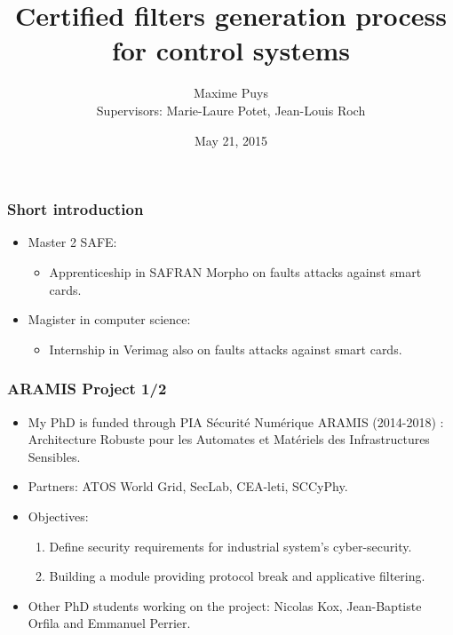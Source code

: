 \documentclass{beamer}
\title[Certified filters for control systems]{Certified filters generation process for control systems}
\author[Maxime Puys]{Maxime Puys\\Supervisors: Marie-Laure Potet, Jean-Louis Roch}
\institute{Verimag, UGA - MOAIS, INRIA}
\date{May 21, 2015}
\begin{document}
\begin{frame}
    \maketitle
\end{frame}

\begin{frame}
    \frametitle{Short introduction}

    \begin{itemize}
        \item Master 2 SAFE:
        \begin{itemize}
            \item Apprenticeship in SAFRAN Morpho on faults attacks against smart cards.
        \end{itemize}
            \vfill
        \item Magister in computer science:
        \begin{itemize}
            \item Internship in Verimag also on faults attacks against smart cards.
        \end{itemize}
    \end{itemize}
\end{frame}

\begin{frame}
    \frametitle{ARAMIS Project 1/2}

    \begin{itemize}
        \item My PhD is funded through PIA S\'ecurit\'e Num\'erique ARAMIS (2014-2018) : Architecture Robuste pour les Automates et Mat\'eriels des Infrastructures Sensibles.
            \vfill
        \item Partners: ATOS World Grid, SecLab, CEA-leti, SCCyPhy.
            \vfill
        \item Objectives:
        \begin{enumerate}
            \item Define security requirements for industrial system's cyber-security.
            \item Building a module providing protocol break and applicative filtering.
        \end{enumerate}
            \vfill
        \item Other PhD students working on the project: Nicolas Kox, Jean-Baptiste Orfila and Emmanuel Perrier.
    \end{itemize}
\end{frame}
\end{document}
